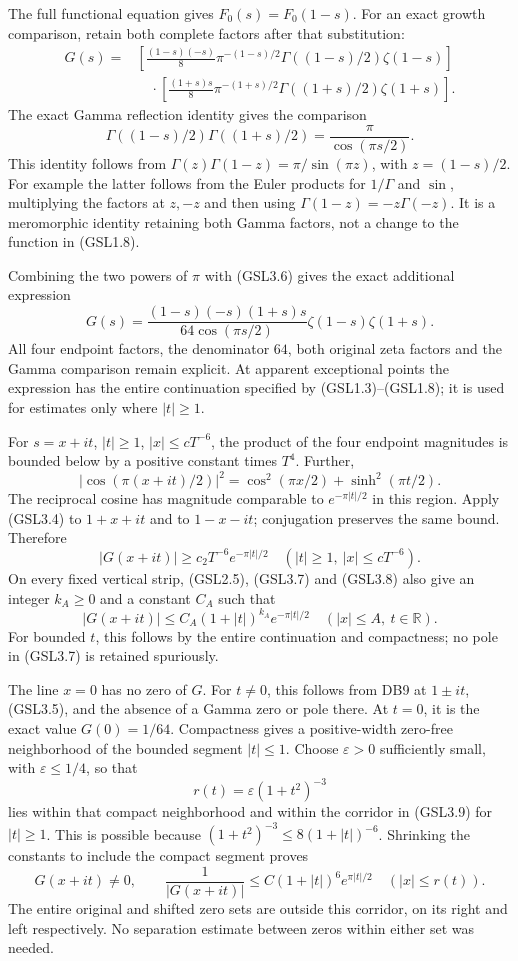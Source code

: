 The full functional equation gives \(F_0(s)=F_0(1-s)\). For an exact
growth comparison, retain both complete factors after that substitution:
\[
\begin{aligned}
G(s)
={}&\left[\frac{(1-s)(-s)}8
 \pi^{-(1-s)/2}\Gamma((1-s)/2)\zeta(1-s)\right]\\
&\quad\cdot\left[\frac{(1+s)s}8
 \pi^{-(1+s)/2}\Gamma((1+s)/2)\zeta(1+s)\right].
\end{aligned}
\tag{GSL3.5}
\] The exact Gamma reflection identity gives the comparison \[
\Gamma((1-s)/2)\Gamma((1+s)/2)
 =\frac\pi{\cos(\pi s/2)}.
\tag{GSL3.6}
\] This identity follows from \(\Gamma(z)\Gamma(1-z)=\pi/\sin(\pi z)\),
with \(z=(1-s)/2\). For example the latter follows from the Euler
products for \(1/\Gamma\) and \(\sin\), multiplying the factors at
\(z,-z\) and then using \(\Gamma(1-z)=-z\Gamma(-z)\). It is a
meromorphic identity retaining both Gamma factors, not a change to the
function in (GSL1.8).

Combining the two powers of \(\pi\) with (GSL3.6) gives the exact
additional expression \[
G(s)=\frac{(1-s)(-s)(1+s)s}{64\cos(\pi s/2)}
 \zeta(1-s)\zeta(1+s).
\tag{GSL3.7}
\] All four endpoint factors, the denominator \(64\), both original zeta
factors and the Gamma comparison remain explicit. At apparent
exceptional points the expression has the entire continuation specified
by (GSL1.3)--(GSL1.8); it is used for estimates only where \(|t|\ge1\).

For \(s=x+it\), \(|t|\ge1\), \(|x|\le cT^{-6}\), the product of the four
endpoint magnitudes is bounded below by a positive constant times
\(T^4\). Further, \[
|\cos(\pi(x+it)/2)|^2
 =\cos^2(\pi x/2)+\sinh^2(\pi t/2).
\tag{GSL3.8}
\] The reciprocal cosine has magnitude comparable to \(e^{-\pi|t|/2}\)
in this region. Apply (GSL3.4) to \(1+x+it\) and to \(1-x-it\);
conjugation preserves the same bound. Therefore \[
|G(x+it)|\ge c_2T^{-6}e^{-\pi|t|/2}
\quad(|t|\ge1,\ |x|\le cT^{-6}).
\tag{GSL3.9}
\] On every fixed vertical strip, (GSL2.5), (GSL3.7) and (GSL3.8) also
give an integer \(k_A\ge0\) and a constant \(C_A\) such that \[
|G(x+it)|\le C_A(1+|t|)^{k_A}e^{-\pi|t|/2}
\quad(|x|\le A,\ t\in\mathbb R).
\tag{GSL3.10}
\] For bounded \(t\), this follows by the entire continuation and
compactness; no pole in (GSL3.7) is retained spuriously.

The line \(x=0\) has no zero of \(G\). For \(t\ne0\), this follows from
DB9 at \(1\pm it\), (GSL3.5), and the absence of a Gamma zero or pole
there. At \(t=0\), it is the exact value \(G(0)=1/64\). Compactness
gives a positive-width zero-free neighborhood of the bounded segment
\(|t|\le1\). Choose \(\varepsilon>0\) sufficiently small, with
\(\varepsilon\le1/4\), so that \[
r(t)=\varepsilon(1+t^2)^{-3}
\tag{GSL3.11}
\] lies within that compact neighborhood and within the corridor in
(GSL3.9) for \(|t|\ge1\). This is possible because
\((1+t^2)^{-3}\le8(1+|t|)^{-6}\). Shrinking the constants to include the
compact segment proves \[
G(x+it)\ne0,\qquad
\frac1{|G(x+it)|}\le C(1+|t|)^6e^{\pi|t|/2}
\quad(|x|\le r(t)).
\tag{GSL3.12}
\] The entire original and shifted zero sets are outside this corridor,
on its right and left respectively. No separation estimate between zeros
within either set was needed.

